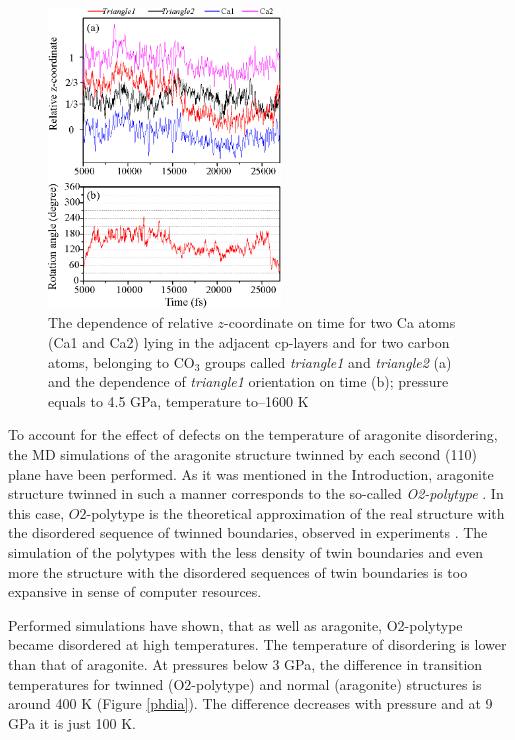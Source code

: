 \documentclass[journal=jacsat,manuscript=article]{achemso}
\begin{document}
\begin{figure}[H]
\includegraphics[width=0.55\textwidth]{z_jump} \centering
\caption{The dependence of relative $z$-coordinate on time for two Ca atoms (Ca1 and Ca2) lying in the adjacent cp-layers and for two carbon atoms, belonging to CO$_3$ groups called {\it triangle1} and {\it triangle2} (a) and the dependence of {\it triangle1} orientation on time (b); pressure equals to 4.5 GPa, temperature to--1600 K} \label{z_jump}
\end{figure}



To account for the effect of defects on the temperature of aragonite disordering, the MD simulations of the aragonite structure twinned by each second (110) plane have been performed.
As it was mentioned in the Introduction, aragonite structure twinned in such a manner corresponds to the so-called {\it O2-polytype} \cite{gavr2019_arag}.
In this case, $O2$-polytype is the theoretical approximation of the real structure with the disordered sequence of twinned boundaries, observed in experiments \cite{gavr2019_arag}.
The simulation of the polytypes with the less density of twin boundaries and even more the structure with the disordered sequences of twin boundaries is too expansive in sense of computer resources.

Performed simulations have shown, that as well as aragonite, O2-polytype became disordered at high temperatures. 
The temperature of disordering is lower than that of aragonite.
At pressures below 3 GPa, the difference in transition temperatures for twinned (O2-polytype) and normal (aragonite) structures is around 400 K (Figure \ref{phdia}). 
The difference decreases with pressure and at 9 GPa it is just 100 K.
\end{document}
